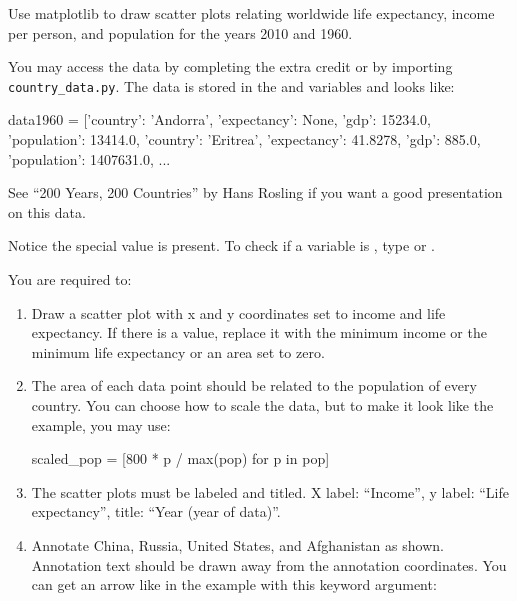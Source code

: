 \documentclass[11pt]{cselabheader}
\begin{document}
\begin{ex}[plotcountries.py]
Use matplotlib to draw scatter plots relating worldwide life expectancy,
income per person, and population for the years 2010 and 1960.

You may access the data by completing the extra credit or by importing
\texttt{country\_data.py}. The data is stored in the 
and  variables and looks like:

\begin{python3code}
data1960 = [{'country': 'Andorra',
    'expectancy': None,
    'gdp': 15234.0,
    'population': 13414.0},
   {'country': 'Eritrea',
    'expectancy': 41.8278,
    'gdp': 885.0,
    'population': 1407631.0}, ...
\end{python3code}

See ``200 Years, 200 Countries'' by Hans Rosling if you want a
good presentation on this data.

Notice the special value  is present.
To check if a variable  is ,
type  or .


You are required to:

\begin{enumerate}
\item Draw a scatter plot with x and y coordinates set to income and life
expectancy. If there is a  value, replace it with the
minimum income or the minimum life expectancy or an area set to zero.

\item The area of each data point should be related to the population of every
country. You can choose how to scale the data, but to make it look like the
example, you may use:

\begin{python3code}
scaled_pop = [800 * p / max(pop) for p in pop]
\end{python3code}

\item The scatter plots must be labeled and titled. X label: ``Income'', y
label: ``Life expectancy'', title: ``Year (year of data)''.

\item Annotate China, Russia, United States, and Afghanistan as shown.
Annotation text should be drawn away from the annotation coordinates.
You can get an arrow like in the example with this keyword argument:


\end{enumerate}
\end{ex}
\end{document}
